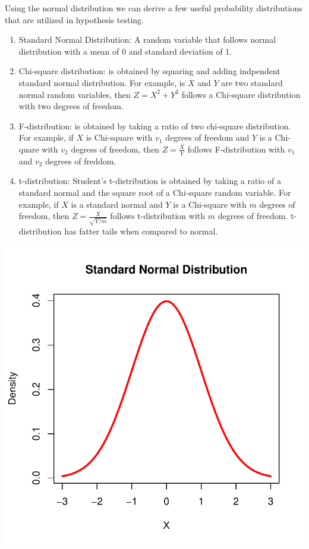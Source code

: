 \documentclass[]{book}
\theoremstyle{definition}
\theoremstyle{definition}
\theoremstyle{definition}
\theoremstyle{remark}
\begin{document}
Using the normal distribution we can derive a few useful probability distributions that are utilized in hypothesis testing.

\begin{enumerate}
\def\labelenumi{\arabic{enumi}.}
\item
  Standard Normal Distribution: A random variable that follows normal distribution with a mean of 0 and standard deviation of 1.
\item
  Chi-square distribution: is obtained by squaring and adding indpendent standard normal distribution. For example, is \(X\) and \(Y\) are two standard normal random variables, then \(Z=X^2 + Y^2\) follows a Chi-square distribution with two degrees of freedom.
\item
  F-distribution: is obtained by taking a ratio of two chi-square distribution. For example, if \(X\) is Chi-square with \(v_1\) degrees of freedom and \(Y\) is a Chi-quare with \(v_2\) degress of freedom, then \(\displaystyle{Z=\frac{X}{Y}}\) follows F-distribution with \(v_1\) and \(v_2\) degrees of freddom.
\item
  t-distribution: Student's t-distribution is obtained by taking a ratio of a standard normal and the square root of a Chi-square random variable. For example, if \(X\) is a standard normal and \(Y\) is a Chi-square with \(m\) degrees of freedom, then \(Z=\displaystyle\frac{X}{\sqrt{Y/m}}\) follows t-distribution with \(m\) degrees of freedom. t-distribution has fatter tails when compared to normal.
\end{enumerate}

\begin{center}\includegraphics{bookdown-demo_files/figure-latex/unnamed-chunk-55-1} \end{center}
\end{document}
